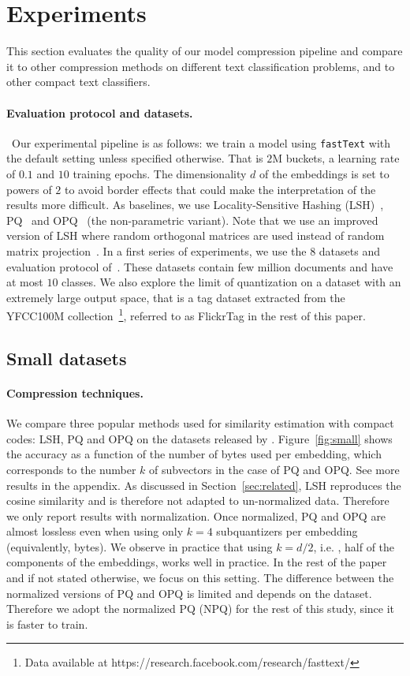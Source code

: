 \section{Experiments}
\label{sec:experiments}

This section evaluates the quality of our model compression pipeline and compare it to other compression methods on different text classification problems, and to other compact text classifiers.

\paragraph{Evaluation protocol and datasets.}~Our experimental pipeline is as follows: we train a model using
\texttt{fastText} with the default setting unless specified otherwise. That is $2$M buckets, a learning rate of $0.1$ and $10$ training epochs. The dimensionality $d$ of the embeddings is set to powers of $2$ to avoid border effects that could make the interpretation of the results more difficult.  As baselines, we use Locality-Sensitive Hashing (LSH)~\citep{C02}, PQ~\citep{JDS11} and OPQ~\citep{GHKS13} (the non-parametric variant).  Note that we use an improved version of LSH where random orthogonal matrices are used instead of random matrix projection~\cite{JDS08}.  In a first series of experiments, we use the $8$ datasets and evaluation protocol of~\citet{Z15}.  These datasets contain few million documents and have at most $10$ classes. We also explore the limit of quantization on a dataset with an extremely large output space, that is a tag dataset extracted from the YFCC100M collection~\citep{T15}\footnote{Data available at https://research.facebook.com/research/fasttext/}, referred to as FlickrTag in the rest of this paper.

\subsection{Small datasets}

\paragraph{Compression techniques.} We compare three popular methods used for similarity estimation with compact codes: LSH, PQ and OPQ on the datasets released by \citet{Z15}.  Figure~\ref{fig:small} shows the accuracy as a function of the number of bytes used per embedding, which corresponds to the number $k$ of subvectors in the case of PQ and OPQ. See more results in the appendix. As discussed in Section~\ref{sec:related}, LSH reproduces the cosine similarity and is therefore not adapted to un-normalized data. Therefore we only report results with normalization.  Once normalized, PQ and OPQ are almost lossless even when using only $k=4$ subquantizers per embedding (equivalently, bytes). We observe in practice that using $k=d/2$, i.e. , half of the components of the embeddings, works well in practice. In the rest of the paper and if not stated otherwise, we focus on this setting. The difference between the normalized versions of PQ and OPQ is limited and depends on the dataset. Therefore we adopt the normalized PQ (NPQ) for the rest of this study, since it is faster to train.

